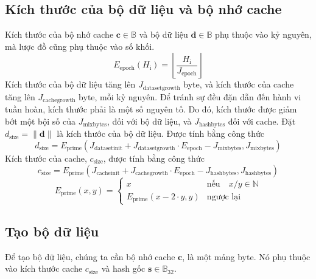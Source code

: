 \documentclass[9pt,oneside]{amsart}
\makeatletter
\newcommand{\linkdest}[1]{\Hy@raisedlink{\hypertarget{#1}{}}}
\makeatother
\begin{document}
\subsection{Kích thước của bộ dữ liệu và bộ nhớ cache}
Kích thước của bộ nhớ cache $\mathbf{c} \in \mathbb{B}$ và bộ dữ liệu $\mathbf{d} \in \mathbb{B}$ phụ thuộc vào kỷ nguyên, mà lược đồ cũng phụ thuộc vào số khối.
\begin{equation}
 E_{\mathrm{epoch}}(H_{\mathrm{i}}) = \left\lfloor\frac{H_{\mathrm{i}}}{J_{\mathrm{epoch}}}\right\rfloor
\end{equation}
Kích thước của bộ dữ liệu tăng lên $J_{\mathrm{datasetgrowth}}$ byte, và kích thước của cache tăng lên $J_{\mathrm{cachegrowth}}$ byte, mỗi kỷ nguyên. Để tránh sự đều đặn dẫn đến hành vi tuần hoàn, kích thước phải là một số nguyên tố. Do đó, kích thước được giảm bớt một bội số của $J_{\mathrm{mixbytes}}$, đối với bộ dữ liệu, và $J_{\mathrm{hashbytes}}$ đối với cache.
\linkdest{d__size}{}Đặt $d_{\mathrm{size}} = \lVert \mathbf{d} \rVert$ là kích thước của bộ dữ liệu. Được tính bằng công thức
\begin{equation}
 d_{\mathrm{size}} = E_{\mathrm{prime}}(J_{\mathrm{datasetinit}} + J_{\mathrm{datasetgrowth}} \cdot E_{\mathrm{epoch}} - J_{\mathrm{mixbytes}}, J_{\mathrm{mixbytes}})
\end{equation}
Kích thước của cache, $c_{\mathrm{size}}$, được tính bằng công thức
\begin{equation}
 c_{\mathrm{size}} = E_{\mathrm{prime}}(J_{\mathrm{cacheinit}} + J_{\mathrm{cachegrowth}} \cdot E_{\mathrm{epoch}} - J_{\mathrm{hashbytes}}, J_{\mathrm{hashbytes}})
\end{equation}
\begin{equation}
 E_{\mathrm{prime}}(x, y) = \begin{cases}
x & \text{nếu} \quad x / y \in \mathbb{N} \\
E_{\mathrm{prime}}(x - 2 \cdot y, y) & \text{ngược lại}
\end{cases}
\end{equation}
\subsection{Tạo bộ dữ liệu}
Để tạo bộ dữ liệu, chúng ta cần bộ nhớ cache $\mathbf{c}$, là một mảng byte. Nó phụ thuộc vào kích thước cache  $c_{\mathrm{size}}$ và hash gốc $\mathbf{s} \in \mathbb{B}_{32}$.
\end{document}

